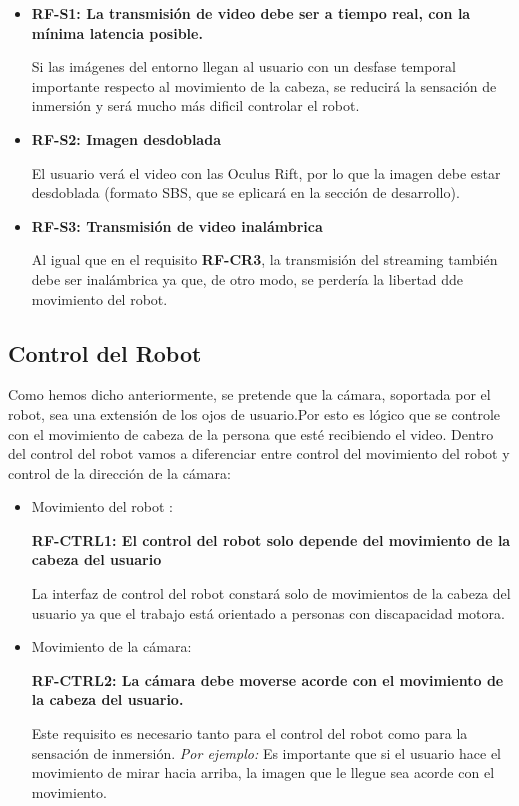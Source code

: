 \documentclass[twoside, 11pt]{epstfg}
\begin{document}
\begin{itemize}
	\item\textbf{RF-S1: La transmisión de video debe ser  a tiempo real, con la mínima latencia posible.}
	
	Si las imágenes del entorno llegan al usuario con un desfase temporal importante respecto al movimiento de la cabeza, se reducirá la sensación de inmersión y será mucho más dificil controlar el robot.
	
	\item\textbf{RF-S2: Imagen desdoblada}
	
	El usuario verá el video con las Oculus Rift, por lo que la imagen debe estar desdoblada (formato SBS, que se eplicará en la sección de desarrollo).
	
	\item\textbf{RF-S3: Transmisión de video inalámbrica}
	
	Al igual que en el requisito \textbf{RF-CR3}, la transmisión del streaming también debe ser inalámbrica ya que, de otro modo, se perdería la libertad dde movimiento del robot.

	
	
\end{itemize}



\subsection{Control del Robot}

Como hemos dicho anteriormente, se pretende que la cámara, soportada por el robot, sea una extensión de los ojos de usuario.Por esto es lógico que se controle con el movimiento de cabeza de la persona que esté recibiendo el video.
Dentro del control del robot vamos a diferenciar entre control del movimiento del robot y control de la dirección de la cámara:

\begin{itemize}
	\item Movimiento del robot :
	
	\textbf{RF-CTRL1: El control del robot solo depende del movimiento de la cabeza del usuario}
	
	La interfaz de control del robot constará solo de movimientos de la cabeza del usuario ya que el trabajo está orientado a personas con discapacidad motora.
	\item  Movimiento de la cámara:
	
	\textbf{RF-CTRL2: La cámara debe moverse acorde con el movimiento de la cabeza del usuario.}
	
	Este requisito es necesario tanto para el control del robot como para la sensación de inmersión.
	\textit{Por ejemplo:} Es importante que si el usuario hace el movimiento de mirar hacia arriba, la imagen que le llegue sea acorde con el movimiento.
	
	
	
\end{itemize}
\end{document}
